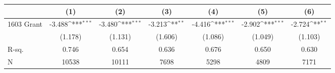 {
\def\sym#1{\ifmmode^{#1}\else\(^{#1}\)\fi}
\begin{tabular}{l*{6}{c}}
\toprule
                &\multicolumn{1}{c}{(1)}         &\multicolumn{1}{c}{(2)}         &\multicolumn{1}{c}{(3)}         &\multicolumn{1}{c}{(4)}         &\multicolumn{1}{c}{(5)}         &\multicolumn{1}{c}{(6)}         \\
\midrule
1603 Grant      &   -3.488\sym{***}&   -3.480\sym{***}&   -3.213\sym{**} &   -4.416\sym{***}&   -2.902\sym{***}&   -2.724\sym{**} \\
                &  (1.178)         &  (1.131)         &  (1.606)         &  (1.086)         &  (1.049)         &  (1.103)         \\
\midrule
R-sq.           &    0.746         &    0.654         &    0.636         &    0.676         &    0.650         &    0.630         \\
N               &    10538         &    10111         &     7698         &     5298         &     4809         &     7171         \\
\bottomrule
\end{tabular}
}
